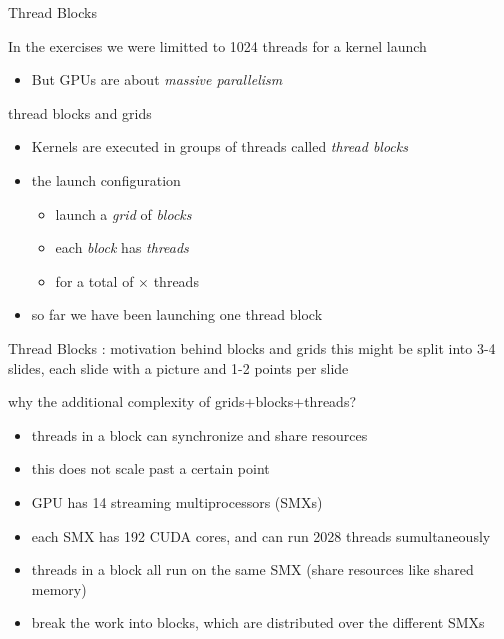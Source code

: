 
\begin{frame}[fragile]{Thread Blocks}
    \begin{info}{}
        In the \axpy exercises we were limitted to 1024 threads for a kernel launch
        \begin{itemize}
            \item But GPUs are about \emph{massive parallelism}
        \end{itemize}
    \end{info}

    \begin{info}{thread blocks and grids}
        \begin{itemize}
            \item Kernels are executed in groups of threads called \emph{thread blocks}
            \item the launch configuration 
            \begin{itemize}
                \item launch a \emph{grid} of  \emph{blocks}
                \item each \emph{block} has  \emph{threads}
                \item for a total of $\times$ threads
            \end{itemize}
            \item so far we have been launching one thread block 
        \end{itemize}
    \end{info}

\end{frame}

\begin{frame}[fragile]{Thread Blocks : motivation behind blocks and grids}
    this might be split into 3-4 slides, each slide with a picture and 1-2 points per slide
    \begin{info}{why the additional complexity of grids+blocks+threads?}
        \begin{itemize}
            \item threads in a block can synchronize and share resources
            \item this does not scale past a certain point
            \item GPU has 14 streaming multiprocessors (SMXs)
            \item each SMX has 192 CUDA cores, and can run 2028 threads sumultaneously
            \item threads in a block all run on the same SMX (share resources like shared memory)
            \item break the work into blocks, which are distributed over the different SMXs
        \end{itemize}
    \end{info}
\end{frame}


